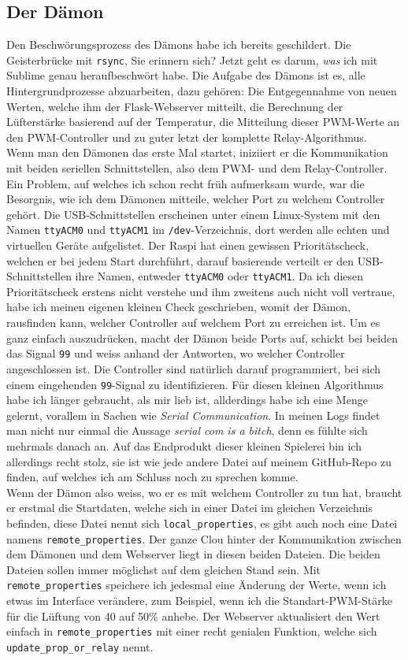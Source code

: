 \documentclass[12pt,titlepage,a4paper]{article}
\begin{document}
\subsection{Der Dämon} 
 Den Beschwörungsprozess des Dämons habe ich bereits geschildert.  Die Geisterbrücke mit \verb^rsync^, Sie erinnern sich? Jetzt geht es darum, \textit{was} ich mit Sublime genau heraufbeschwört habe. Die Aufgabe des Dämons ist es, alle Hintergrundprozesse abzuarbeiten, dazu gehören: Die Entgegennahme von neuen Werten, welche ihm der Flask-Webserver mitteilt, die Berechnung der Lüfterstärke basierend auf der Temperatur, die Mitteilung dieser PWM-Werte an den PWM-Controller und zu guter letzt der komplette Relay-Algorithmus. \\ Wenn man den Dämonen das erste Mal startet, iniziiert er die Kommunikation mit beiden seriellen Schnittstellen, also dem PWM-  und dem Relay-Controller. Ein Problem, auf welches ich schon recht früh aufmerksam wurde, war die Besorgnis, wie ich dem Dämonen mitteile, welcher Port zu welchem Controller gehört. Die USB-Schnittstellen erscheinen unter einem Linux-System mit den Namen  \verb^ttyACM0^ und \verb^ttyACM1^ im  \verb^/dev^-Verzeichnis, dort werden alle echten und virtuellen Geräte aufgelistet. Der Raspi hat einen gewissen Prioritätscheck, welchen er bei jedem Start durchführt, darauf basierende verteilt er den USB-Schnittstellen ihre Namen, entweder \verb^ttyACM0^ oder \verb^ttyACM1^. Da ich diesen Prioritätscheck erstens nicht verstehe und ihm zweitens auch nicht voll vertraue, habe ich meinen eigenen kleinen Check geschrieben, womit der Dämon, rausfinden kann, welcher Controller auf welchem Port zu erreichen ist. Um es ganz einfach auszudrücken, macht der Dämon beide Ports auf, schickt bei beiden das Signal  \verb^99^ und weiss anhand der Antworten, wo welcher Controller angeschlossen ist. Die Controller sind natürlich darauf programmiert, bei sich einem eingehenden  \verb^99^-Signal zu identifizieren. Für diesen kleinen Algorithmus habe ich länger gebraucht, als mir lieb ist, allderdings habe ich eine Menge gelernt, vorallem in Sachen wie \textit{Serial Communication}. In meinen Logs findet man nicht nur einmal die Aussage \textit{serial com is a bitch}, denn es fühlte sich mehrmals danach an. Auf das Endprodukt dieser kleinen Spielerei bin ich allerdings recht stolz, sie ist wie jede andere Datei auf meinem GitHub-Repo zu finden, auf welches ich am Schluss noch zu sprechen komme.\\Wenn der Dämon also weiss, wo er es mit welchem Controller zu tun hat, braucht er erstmal die Startdaten, welche sich in einer Datei im gleichen Verzeichnis befinden, diese Datei nennt sich  \verb^local_properties^, es gibt auch noch eine Datei namens  \verb^remote_properties^. Der ganze Clou hinter der Kommunikation zwischen dem Dämonen und dem Webserver liegt in diesen beiden Dateien. Die beiden Dateien sollen immer möglichst auf dem gleichen Stand sein. Mit \verb^remote_properties^ speichere ich jedesmal eine Änderung der Werte, wenn ich etwas im Interface verändere, zum Beispiel, wenn ich die Standart-PWM-Stärke für die Lüftung von 40 auf 50\% anhebe. Der Webserver aktualisiert den Wert einfach in \verb^remote_properties^ mit einer recht genialen Funktion, welche sich \verb^update_prop_or_relay^ nennt.
\end{document}
